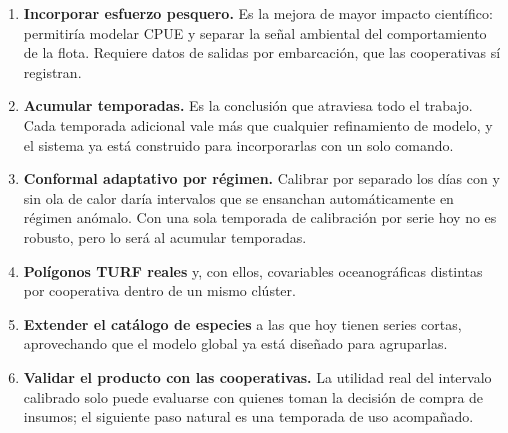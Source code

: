 \begin{enumerate}
  \item \textbf{Incorporar esfuerzo pesquero.} Es la mejora de mayor impacto científico:
  permitiría modelar CPUE y separar la señal ambiental del comportamiento de la flota. Requiere
  datos de salidas por embarcación, que las cooperativas sí registran.

  \item \textbf{Acumular temporadas.} Es la conclusión que atraviesa todo el trabajo. Cada
  temporada adicional vale más que cualquier refinamiento de modelo, y el sistema ya está
  construido para incorporarlas con un solo comando.

  \item \textbf{Conformal adaptativo por régimen.} Calibrar por separado los días con y sin ola
  de calor daría intervalos que se ensanchan automáticamente en régimen anómalo. Con una sola
  temporada de calibración por serie hoy no es robusto, pero lo será al acumular temporadas.

  \item \textbf{Polígonos TURF reales} y, con ellos, covariables oceanográficas distintas por
  cooperativa dentro de un mismo clúster.

  \item \textbf{Extender el catálogo de especies} a las que hoy tienen series cortas,
  aprovechando que el modelo global ya está diseñado para agruparlas.

  \item \textbf{Validar el producto con las cooperativas.} La utilidad real del intervalo
  calibrado solo puede evaluarse con quienes toman la decisión de compra de insumos; el
  siguiente paso natural es una temporada de uso acompañado.
\end{enumerate}
